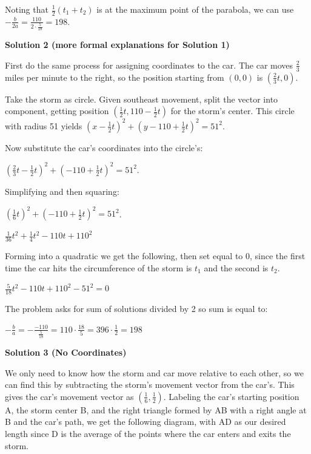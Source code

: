 \begin{enumerate}
 Noting that $\frac 12 \left(t_1+t_2 \right)$ is at the maximum point of the parabola, we can use $-\frac{b}{2a} = \frac{110}{2 \cdot \frac{5}{18}} = \boxed{198}$.

 



\textbf{Solution 2 (more formal explanations for Solution 1)}

First do the same process for assigning coordinates to the car. The car moves $\frac{2}{3}$ miles per minute to the right, so the position starting from $(0,0)$ is $\left(\frac{2}{3}t, 0\right)$. 

 Take the storm as circle. Given southeast movement, split the vector into component, getting position $\left(\frac{1}{2}t, 110 - \frac{1}{2}t\right)$ for the storm's center. This circle with radius 51 yields $\left(x - \frac{1}{2}t\right)^2 + \left(y -110 + \frac{1}{2}t\right)^2 = 51^2$. 

 Now substitute the car's coordinates into the circle's:

 $\left(\frac{2}{3}t - \frac{1}{2}t\right)^2 + \left(-110 + \frac{1}{2}t\right)^2 = 51^2$. 

 Simplifying and then squaring:

 $\left(\frac{1}{6}t\right)^2 + \left(-110 + \frac{1}{2}t\right)^2 = 51^2$. 

 $\frac{1}{36}t^2 + \frac{1}{4}t^2 - 110t + 110^2$

 
Forming into a quadratic we get the following, then set equal to 0, since the first time the car hits the circumference of the storm is $t_{1}$ and the second is $t_{2}$.

 
$\frac{5}{18}t^2 - 110t + 110^2 - 51^2 = 0$

 
The problem asks for sum of solutions divided by 2 so sum is equal to:

 $-\frac{b}{a} = -\frac{-110}{\frac{5}{18}} = 110\cdot{\frac{18}{5}} = 396\cdot{\frac{1}{2}} = \boxed{198}$




\textbf{Solution 3 (No Coordinates)}

We only need to know how the storm and car move relative to each other, so we can find this by subtracting the storm's movement vector from the car's.  This gives the car's movement vector as $\left(\frac{1}{6}, \frac{1}{2}\right)$.  Labeling the car's starting position A, the storm center B, and the right triangle formed by AB with a right angle at B and the car's path, we get the following diagram, with AD as our desired length since D is the average of the points where the car enters and exits the storm.


\end{enumerate}
